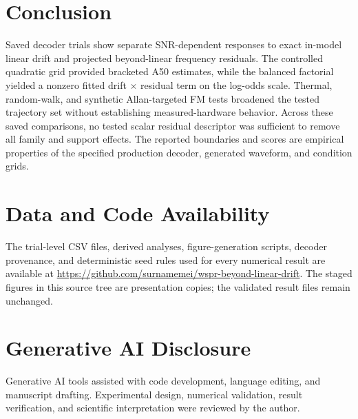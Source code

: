 \documentclass[conference]{IEEEtran}
\begin{document}
\section{Conclusion}
Saved decoder trials show separate SNR-dependent responses to exact in-model linear drift and projected beyond-linear frequency residuals. The controlled quadratic grid provided bracketed A50 estimates, while the balanced factorial yielded a nonzero fitted drift $\times$ residual term on the log-odds scale. Thermal, random-walk, and synthetic Allan-targeted FM tests broadened the tested trajectory set without establishing measured-hardware behavior. Across these saved comparisons, no tested scalar residual descriptor was sufficient to remove all family and support effects. The reported boundaries and scores are empirical properties of the specified production decoder, generated waveform, and condition grids.

\section*{Data and Code Availability}
The trial-level CSV files, derived analyses, figure-generation scripts, decoder provenance, and deterministic seed rules used for every numerical result are available at \url{https://github.com/surnamemei/wspr-beyond-linear-drift}. The staged figures in this source tree are presentation copies; the validated result files remain unchanged.

\section*{Generative AI Disclosure}
Generative AI tools assisted with code development, language editing, and manuscript drafting. Experimental design, numerical validation, result verification, and scientific interpretation were reviewed by the author.



\end{document}
